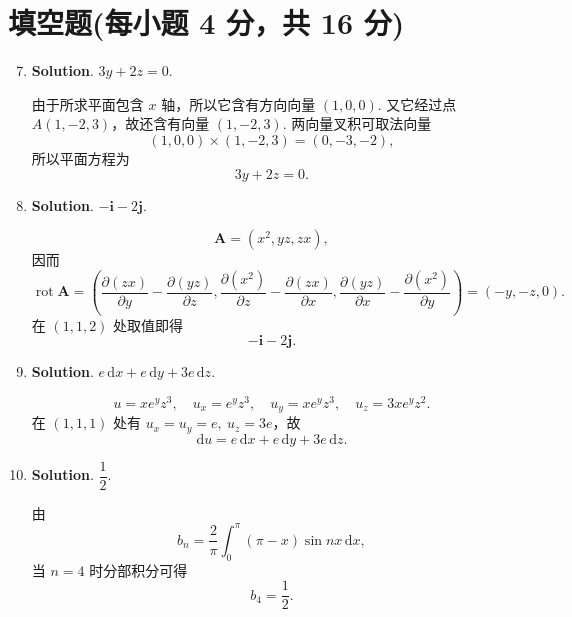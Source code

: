 \documentclass[../Main.tex]{subfiles}
\begin{document}
\section{填空题(每小题 4 分，共 16 分)}
\begin{enumerate}
    \setcounter{enumi}{6}
    \item \textbf{Solution}. $3y+2z=0$.

          由于所求平面包含 \(x\) 轴，所以它含有方向向量 \((1,0,0)\). 又它经过点 \(A(1,-2,3)\)，故还含有向量 \((1,-2,3)\). 两向量叉积可取法向量
          \[
              (1,0,0)\times(1,-2,3)=(0,-3,-2),
          \]
          所以平面方程为
          \[
              3y+2z=0.
          \]

    \item \textbf{Solution}. $-\boldsymbol{i}-2\boldsymbol{j}$.

          \[
              \boldsymbol{A}=(x^2,yz,zx),
          \]
          因而
          \[
              \operatorname{rot}\boldsymbol{A}
              =\left(\frac{\partial(zx)}{\partial y}-\frac{\partial(yz)}{\partial z},
              \frac{\partial(x^2)}{\partial z}-\frac{\partial(zx)}{\partial x},
              \frac{\partial(yz)}{\partial x}-\frac{\partial(x^2)}{\partial y}\right)
              =(-y,-z,0).
          \]
          在 \((1,1,2)\) 处取值即得
          \[
              -\boldsymbol{i}-2\boldsymbol{j}.
          \]

    \item \textbf{Solution}. $e\,\mathrm{d}x+e\,\mathrm{d}y+3e\,\mathrm{d}z$.

          \[
              u=xe^yz^3,\quad u_x=e^yz^3,\quad u_y=xe^yz^3,\quad u_z=3xe^yz^2.
          \]
          在 \((1,1,1)\) 处有 \(u_x=u_y=e,\ u_z=3e\)，故
          \[
              \mathrm{d}u=e\,\mathrm{d}x+e\,\mathrm{d}y+3e\,\mathrm{d}z.
          \]

    \item \textbf{Solution}. $\dfrac12$.

          由
          \[
              b_n=\frac{2}{\pi}\int_0^\pi(\pi-x)\sin nx\,\mathrm{d}x,
          \]
          当 \(n=4\) 时分部积分可得
          \[
              b_4=\frac12.
          \]
\end{enumerate}
\end{document}
